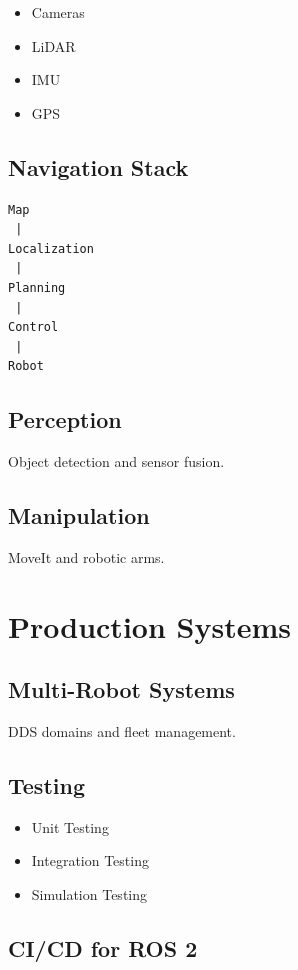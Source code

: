 \documentclass[11pt,oneside]{book}
\begin{document}
\begin{itemize}
\item Cameras
\item LiDAR
\item IMU
\item GPS
\end{itemize}

\chapter{Navigation Stack}

\begin{verbatim}
Map
 |
Localization
 |
Planning
 |
Control
 |
Robot
\end{verbatim}

\chapter{Perception}

Object detection and sensor fusion.

\chapter{Manipulation}

MoveIt and robotic arms.

\part{Production Systems}

\chapter{Multi-Robot Systems}

DDS domains and fleet management.

\chapter{Testing}

\begin{itemize}
\item Unit Testing
\item Integration Testing
\item Simulation Testing
\end{itemize}

\chapter{CI/CD for ROS 2}
\end{document}
